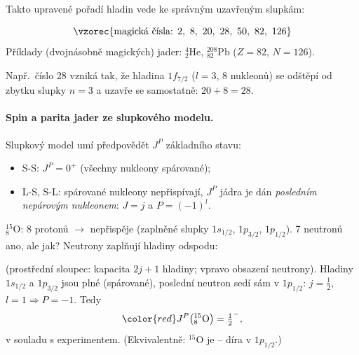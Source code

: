 Takto upravené pořadí hladin vede ke správným uzavřeným slupkám:
\begin{veta}
\[
  \vzorec{\text{magická čísla: } 2,\ 8,\ 20,\ 28,\ 50,\ 82,\ 126}
\]
Příklady (dvojnásobně magických) jader: \({}^{4}_{2}\mathrm{He}\),
\({}^{208}_{82}\mathrm{Pb}\) (\(Z=82\), \(N=126\)).
\end{veta}
Např.\ číslo 28 vzniká tak, že hladina \(1f_{7/2}\) (\(l=3\), 8 nukleonů)
se odštěpí od zbytku slupky \(n=3\) a uzavře se samostatně: \(20+8=28\).

\paragraph{Spin a parita jader ze slupkového modelu.} Slupkový model umí
předpovědět \(J^P\) základního stavu:
\begin{itemize}
  \item S-S: \(J^P = 0^+\) (všechny nukleony spárované);
  \item L-S, S-L: spárované nukleony nepřispívají, \(J^P\) jádra je dán
    \emph{posledním nepárovým nukleonem}: \(J=j\) a \(P=(-1)^l\).
\end{itemize}

\begin{priklad}[\({}^{15}_{8}\mathrm{O}\)]
\({}^{15}_{8}\mathrm{O}\): 8 protonů \(\to\) nepřispěje (zaplněné
slupky \(1s_{1/2}\), \(1p_{3/2}\), \(1p_{1/2}\)). 7 neutronů ano, ale jak?
Neutrony zaplňují hladiny odspodu:
\begin{center}
\end{center}
(prostřední sloupec: kapacita \(2j+1\) hladiny; vpravo obsazení neutrony).
Hladiny \(1s_{1/2}\) a \(1p_{3/2}\) jsou plné (spárované), poslední neutron
sedí sám v \(1p_{1/2}\): \(j=\tfrac12\), \(l=1\Rightarrow P=-1\). Tedy
\[
  \color{red} J^P\big({}^{15}_{8}\mathrm{O}\big) = \tfrac12^- ,
\]
v souladu s experimentem. (Ekvivalentně: \({}^{15}\)O je
 -- díra v \(1p_{1/2}\).)
\end{priklad}

